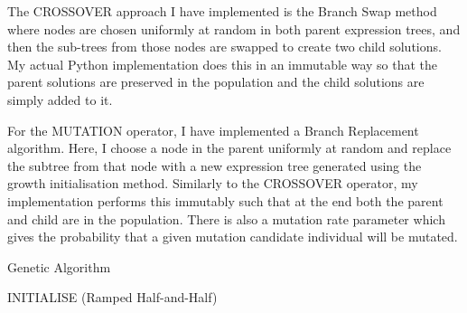 \documentclass[11pt]{article}
\DeclarePairedDelimiter{\ceil}{\lceil}{\rceil}
\begin{document}
The CROSSOVER approach I have implemented is the Branch Swap method where nodes are chosen uniformly at random in both parent expression trees, and then the sub-trees from those nodes are swapped to create two child solutions.
My actual Python implementation does this in an immutable way so that the parent solutions are preserved in the population and the child solutions are simply added to it.

For the MUTATION operator, I have implemented a Branch Replacement algorithm.
Here, I choose a node in the parent uniformly at random and replace the subtree from that node with a new expression tree generated using the growth initialisation method.
Similarly to the CROSSOVER operator, my implementation performs this immutably such that at the end both the parent and child are in the population.
There is also a mutation rate parameter which gives the probability that a given mutation candidate individual will be mutated.

\begin{algorithm}[h]
  \caption{Genetic Algorithm}
  \label{alg:ga}
  \DontPrintSemicolon
\end{algorithm}

\begin{algorithm}[h]
  \caption{INITIALISE (Ramped Half-and-Half)}
  \label{alg:init}
  \DontPrintSemicolon
\end{algorithm}
\end{document}
